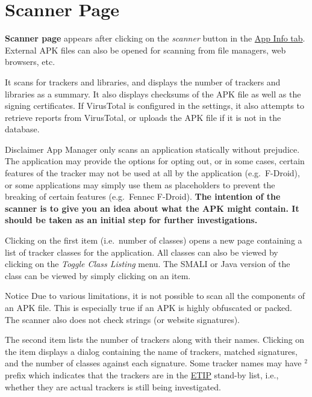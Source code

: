 \section{Scanner Page}\label{sec:scanner-page} %
\textbf{Scanner page} appears after clicking on the \emph{scanner} button in the \hyperref[subsec:app-info-tab]{App Info tab}.
External APK files can also be opened for scanning from file managers, web browsers, etc.

It scans for trackers and libraries, and displays the number of trackers and libraries as a summary.
It also displays checksums of the APK file as well as the signing certificates. If VirusTotal is
configured in the settings, it also attempts to retrieve reports from VirusTotal, or uploads the APK
file if it is not in the database.

\begin{danger}{Disclaimer}
    App Manager only scans an application statically without prejudice. The application may provide
    the options for opting out, or in some cases, certain features of the tracker may not be used at
    all by the application (e.g.\ F-Droid), or some applications may simply use them as placeholders
    to prevent the breaking of certain features (e.g.\ Fennec F-Droid). \textbf{The intention of the
    scanner is to give you an idea about what the APK might contain. It should be taken as an
    initial step for further investigations.}
\end{danger}

Clicking on the first item (i.e.\ number of classes) opens a new page containing a list of tracker
classes for the application. All classes can also be viewed by clicking on the \textit{Toggle Class
Listing} menu. The SMALI or Java version of the class can be viewed by simply clicking on an item.

\begin{tip}{Notice}
    Due to various limitations, it is not possible to scan all the components of an APK file. This
    is especially true if an APK is highly obfuscated or packed. The scanner also does not check
    strings (or website signatures).
\end{tip}

The second item lists the number of trackers along with their names. Clicking on the item displays a
dialog containing the name of trackers, matched signatures, and the number of classes against each
signature. Some tracker names may have $^2$ prefix which indicates that the trackers are in the
\href{https://etip.exodus-privacy.eu.org}{ETIP} stand-by list, i.e., whether they are actual
trackers is still being investigated.

